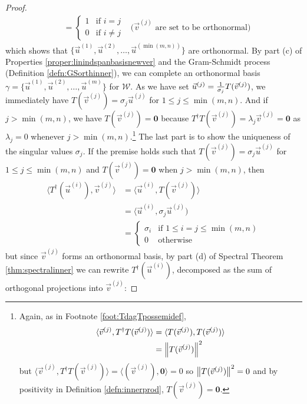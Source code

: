 \begin{proof}
\begin{align}
&= 
\begin{cases}
1 & \text{if } i = j \\
0 & \text{if } i \neq j
\end{cases}
& \text{($\vec{v}^{(j)}$ are set to be orthonormal)}
\end{align}
which shows that $\{\vec{u}^{(1)}, \vec{u}^{(2)},\ldots,\vec{u}^{(\min(m,n))}\}$ are orthonormal. By part (c) of Properties \ref{proper:linindspanbasisnewver} and the Gram-Schmidt process (Definition \ref{defn:GSorthinner}), we can complete an orthonormal basis $\gamma = \{\vec{u}^{(1)}, \vec{u}^{(2)},\ldots,\vec{u}^{(m)}\}$ for $\mathcal{W}$. As we have set $\vec{u}^{(j)} = \smash{\frac{1}{\sigma_j}T(\vec{v}^{(j)})}$, we immediately have $T(\vec{v}^{(j)}) = \sigma_j\vec{u}^{(j)}$ for $1 \leq j \leq \min(m,n)$. And if $j > \min(m,n)$, we have $T(\vec{v}^{(j)}) = \textbf{0}$ because $T^\dag T(\vec{v}^{(j)}) = \lambda_j \vec{v}^{(j)} = \textbf{0}$ as $\lambda_j = 0$ whenever $j > \min(m,n)$.\footnote{Again, as in Footnote \ref{foot:TdagTpossemidef}, 
\begin{align*}
\langle \vec{v}^{(j)}, T^\dag T (\vec{v}^{(j)}) \rangle &= \langle T(\vec{v}^{(j)}), T(\vec{v}^{(j)}) \rangle \\
&= \norm{T(\vec{v}^{(j)})}^2
\end{align*}
but $\langle \vec{v}^{(j)}, T^\dag T(\vec{v}^{(j)}) \rangle = \langle (\vec{v}^{(j)}), \textbf{0} \rangle = 0$ so $\norm{T(\vec{v}^{(j)})}^2 = 0$ and by positivity in Definition \ref{defn:innerprod}, $T(\vec{v}^{(j)}) = \textbf{0}$.}
The last part is to show the uniqueness of the singular values $\sigma_j$. If the premise holds such that $T(\vec{v}^{(j)}) = \sigma_j \vec{u}^{(j)}$ for $1\leq j \leq \min(m,n)$ and $T(\vec{v}^{(j)}) = \textbf{0}$ when $j > \min(m,n)$, then
\begin{align}
\langle T^\dag(\vec{u}^{(i)}), \vec{v}^{(j)} \rangle &= \langle \vec{u}^{(i)}, T(\vec{v}^{(j)}) \rangle \nonumber \\
&= \langle \vec{u}^{(i)}, \sigma_j \vec{u}^{(j)}) \nonumber \\
&= \begin{cases}
\sigma_i & \text{if } 1 \leq i = j \leq \min(m,n) \\
0 & \text{otherwise} 
\end{cases}
\end{align}
but since $\vec{v}^{(j)}$ forms an orthonormal basis, by part (d) of Spectral Theorem \ref{thm:spectralinner} we can rewrite $T^\dag (\vec{u}^{(i)})$, decomposed as the sum of orthogonal projections into $\vec{v}^{(j)}$:

\end{proof}
